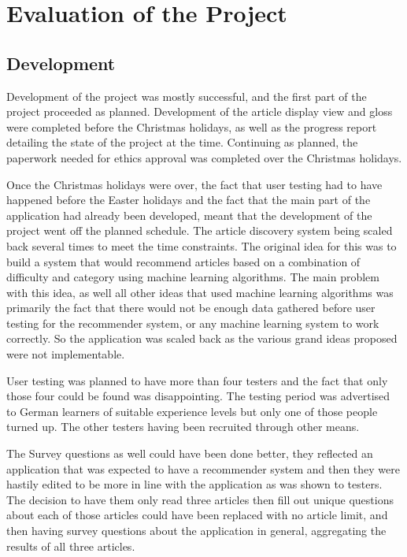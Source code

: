 \chapter{Evaluation of the Project}

\section{Development}

Development of the project was mostly successful, and the first part of the project proceeded as planned. Development of the article display view and gloss were completed before the Christmas holidays, as well as the progress report detailing the state of the project at the time. Continuing as planned, the paperwork needed for ethics approval was completed over the Christmas holidays. 

Once the Christmas holidays were over, the fact that user testing had to have happened before the Easter holidays and the fact that the main part of the application had already been developed, meant that the development of the project went off the planned schedule. The article discovery system being scaled back several times to meet the time constraints. The original idea for this was to build a system that would recommend articles based on a combination of difficulty and category using machine learning algorithms. The main problem with this idea, as well all other ideas that used machine learning algorithms was primarily the fact that there would not be enough data gathered before user testing for the recommender system, or any machine learning system to work correctly. So the application was scaled back as the various grand ideas proposed were not implementable.

User testing was planned to have more than four testers and the fact that only those four could be found was disappointing. The testing period was advertised to German learners of suitable experience levels but only one of those people turned up. The other testers having been recruited through other means. 

The Survey questions as well could have been done better, they reflected an application that was expected to have a recommender system and then they were hastily edited to be more in line with the application as was shown to testers. The decision to have them only read three articles then fill out unique questions about each of those articles could have been replaced with no article limit, and then having survey questions about the application in general, aggregating the results of all three articles.

